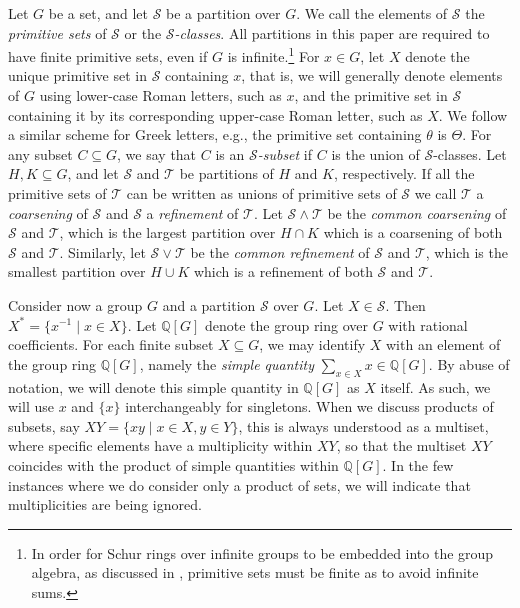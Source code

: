 \documentclass{article}
\theoremstyle{plain}
\theoremstyle{definition}
\renewcommand{\S}{\mathcal{S}}
\newcommand{\T}{\mathcal{T}}
\newcommand{\Q}{\mathbb{Q}}
\newcommand{\QG}{\Q[G]}
\begin{document}
Let $G$ be a set, and let $\S$ be a partition over $G$. We call the elements of $\S$ the \emph{primitive sets} of $\S$ or the \emph{$\S$-classes}. All partitions in this paper are required to have finite primitive sets, even if $G$ is infinite.\footnote{In order for Schur rings over infinite groups to be embedded into the group algebra, as discussed in \cite{InfiniteI}, primitive sets must be finite as to avoid infinite sums.} For $x\in G$, let $X$ denote the unique primitive set in $\S$ containing $x$, that is, we will generally denote elements of $G$ using lower-case Roman letters, such as $x$, and the primitive set in $\S$ containing it by its corresponding upper-case Roman letter, such as $X$. We follow a similar scheme for Greek letters, e.g., the primitive set containing $\theta$ is $\Theta$. For any subset $C\subseteq G$, we say that $C$ is an \emph{$\S$-subset} if $C$ is the union of $\S$-classes.  Let $H, K \subseteq G$, and let $\S$ and $\T$ be partitions of $H$ and $K$, respectively. If all the primitive sets of $\T$ can be written as unions of primitive sets of $\S$ we call $\T$ a \emph{coarsening} of $\S$ and $\S$ a \emph{refinement} of $\T$. Let $\S\wedge \T$ be the \emph{common coarsening} of $\S$ and $\T$, which is the largest partition over $H\cap K$ which is a coarsening of both $\S$ and $\T$. Similarly, let $\S\vee \T$ be the \emph{common refinement} of $\S$ and $\T$, which is the smallest partition over $H\cup K$ which is a refinement of both $\S$ and $\T$. 

Consider now a group $G$ and a partition $\S$ over $G$. Let $X\in \S$. Then $X^* = \{x^{-1}\mid x\in X\}$. Let $\QG$ denote the group ring over $G$ with rational coefficients. For each finite subset $X\subseteq G$, we may identify $X$ with an element of the group ring $\QG$, namely the \emph{simple quantity} $\sum_{x\in X} x\in \QG$. By abuse of notation, we will denote this simple quantity in $\QG$ as $X$ itself. As such, we will use $x$ and $\{x\}$ interchangeably for singletons. When we discuss products of subsets, say $XY = \{xy\mid x\in X,y\in Y\}$, this is always understood as a multiset, where specific elements have a multiplicity within $XY$, so that the multiset $XY$ coincides with the product of simple quantities within $\QG$. In the few instances where we do consider only a product of sets, we will indicate that multiplicities are being ignored.
\end{document}
